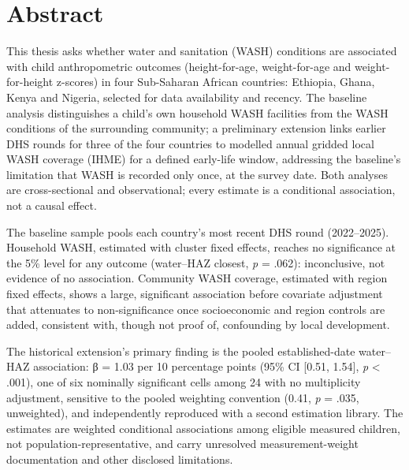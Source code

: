 
\section*{Abstract}\label{sec:abstract}

This thesis asks whether water and sanitation (WASH) conditions are associated with child anthropometric outcomes (height-for-age, weight-for-age and weight-for-height z-scores) in four Sub-Saharan African countries: Ethiopia, Ghana, Kenya and Nigeria, selected for data availability and recency. The baseline analysis distinguishes a child's own household WASH facilities from the WASH conditions of the surrounding community; a preliminary extension links earlier DHS rounds for three of the four countries to modelled annual gridded local WASH coverage (IHME) for a defined early-life window, addressing the baseline's limitation that WASH is recorded only once, at the survey date. Both analyses are cross-sectional and observational; every estimate is a conditional association, not a causal effect.

The baseline sample pools each country's most recent DHS round (2022--2025). Household WASH, estimated with cluster fixed effects, reaches no significance at the 5\% level for any outcome (water--HAZ closest, \emph{p} = .062): inconclusive, not evidence of no association. Community WASH coverage, estimated with region fixed effects, shows a large, significant association before covariate adjustment that attenuates to non-significance once socioeconomic and region controls are added, consistent with, though not proof of, confounding by local development.

The historical extension's primary finding is the pooled established-date water--HAZ association: β = 1.03 per 10 percentage points (95\% CI {[}0.51, 1.54{]}, \emph{p} \textless{} .001), one of six nominally significant cells among 24 with no multiplicity adjustment, sensitive to the pooled weighting convention (0.41, \emph{p} = .035, unweighted), and independently reproduced with a second estimation library. The estimates are weighted conditional associations among eligible measured children, not population-representative, and carry unresolved measurement-weight documentation and other disclosed limitations.

